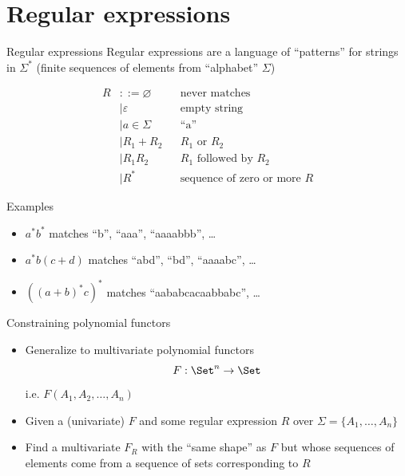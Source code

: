 \documentclass[xcolor=svgnames,12pt]{beamer}
\newcommand{\realt}{+}
\newenvironment{xframe}[1][]
  {\begin{frame}[fragile,environment=xframe,#1]}
  {\end{frame}}
\begin{document}
\section{Regular expressions}

\begin{xframe}{Regular expressions}
  Regular expressions are a language of ``patterns'' for strings in
  $\Sigma^*$ (finite sequences of elements from ``alphabet'' $\Sigma$)

  \begin{align*}
    R &::= \varnothing && \text{never matches} \\
    &\mid \varepsilon && \text{empty string} \\
    &\mid a \in \Sigma && \text{``a''} \\
    &\mid R_1 \realt R_2 && \text{$R_1$ or $R_2$} \\
    &\mid R_1R_2 && \text{$R_1$ followed by $R_2$} \\
    &\mid R^* && \text{sequence of zero or more $R$}
  \end{align*}
\end{xframe}

\begin{xframe}{Examples}
  \begin{itemize}
  \item $a^*b^*$ \quad matches ``b'', ``aaa'', ``aaaabbb'', \dots
  \item $a^* b (c+d)$ \quad matches ``abd'', ``bd'', ``aaaabc'', \dots
  \item $((a+b)^*c)^*$ \quad matches ``aababcacaabbabc'', \dots
  \end{itemize}
\end{xframe}

\begin{xframe}{Constraining polynomial functors}
  \begin{itemize}
  \item Generalize to multivariate polynomial functors \[ F : \Set^n
    \to \Set \] i.e. $F(A_1, A_2, \dots, A_n)$
  \item Given a (univariate) $F$ and some regular expression $R$ over
    $\Sigma = \{A_1, \dots, A_n\}$
  \item Find a multivariate $F_R$ with the ``same shape'' as $F$ but
    whose sequences of elements come from a sequence of sets
    corresponding to $R$
  \end{itemize}
\end{xframe}
\end{document}
